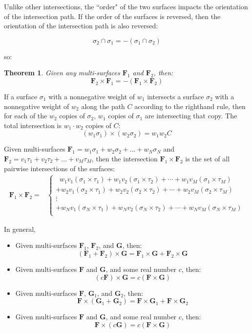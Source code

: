 \documentclass{book}
\newtheorem{thm}{Theorem}
\begin{document}
Unlike other intersections, the ``order" of the two surfaces impacts the orientation of the intersection path. If the order of the surfaces is reversed, then the orientation of the intersection path is also reversed:

\[\sigma_2 \cap \sigma_1 = -(\sigma_1 \cap \sigma_2)\]

so:

\begin{thm}
Given any multi-surfaces \(\mathbf{F}_1\) and \(\mathbf{F}_2\), then:
\[\mathbf{F}_2 \times \mathbf{F}_1 = -(\mathbf{F}_1 \times \mathbf{F}_2)\]
\end{thm}

If a surface \(\sigma_1\) with a nonnegative weight of \(w_1\) intersects a surface \(\sigma_2\) with a nonnegative weight of \(w_2\) along the path \(C\) according to the righthand rule, then for each of the \(w_2\) copies of \(\sigma_2\), \(w_1\) copies of \(\sigma_1\) are intersecting that copy. The total intersection is \(w_1 \cdot w_2\) copies of \(C\):
\[(w_1 \sigma_1) \times (w_2 \sigma_2) = w_1 w_2 C\] 

Given multi-surfaces \(\mathbf{F}_1 = w_1\sigma_1 + w_2\sigma_2 + ... + w_N\sigma_N\) and \\ \(\mathbf{F}_2 = v_1\tau_1 + v_2\tau_2 + ... + v_M\tau_M\), then the intersection \(\mathbf{F}_1 \times \mathbf{F}_2\) is the set of all pairwise intersections of the surfaces:
\begin{align*}
\mathbf{F}_1 \times \mathbf{F}_2 = & \left\{\begin{array}{c}
\;\; w_1 v_1 (\sigma_1 \times \tau_1) + w_1 v_2 (\sigma_1 \times \tau_2) + \cdots + w_1 v_M (\sigma_1 \times \tau_M) \\ 
+ w_2 v_1 (\sigma_2 \times \tau_1) + w_2 v_2 (\sigma_2 \times \tau_2) + \cdots + w_2 v_M (\sigma_2 \times \tau_M) \\ 
\vdots \\
+ w_N v_1 (\sigma_N \times \tau_1) + w_N v_2 (\sigma_N \times \tau_2) + \cdots + w_N v_M (\sigma_N \times \tau_M) \\ 
\end{array}\right.
\end{align*}

In general,
\begin{itemize}
\item Given multi-surfaces \(\mathbf{F}_1\), \(\mathbf{F}_2\), and \(\mathbf{G}\), then:
\[(\mathbf{F}_1 + \mathbf{F}_2) \times \mathbf{G} = \mathbf{F}_1 \times \mathbf{G} + \mathbf{F}_2 \times \mathbf{G}\] 
\item Given multi-surfaces \(\mathbf{F}\) and \(\mathbf{G}\), and some real number \(c\), then:
\[(c\mathbf{F}) \times \mathbf{G} = c(\mathbf{F} \times \mathbf{G})\]
\item Given multi-surfaces \(\mathbf{F}\), \(\mathbf{G}_1\), and \(\mathbf{G}_2\), then:
\[\mathbf{F} \times (\mathbf{G}_1 + \mathbf{G}_2) = \mathbf{F} \times \mathbf{G}_1 + \mathbf{F} \times \mathbf{G}_2\] 
\item Given multi-surfaces \(\mathbf{F}\) and \(\mathbf{G}\), and some real number \(c\), then:
\[\mathbf{F} \times (c\mathbf{G}) = c(\mathbf{F} \times \mathbf{G})\]
\end{itemize}
\end{document}
